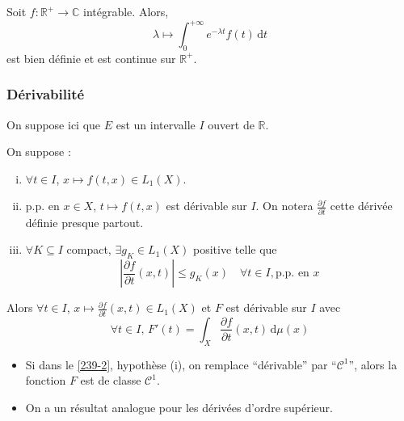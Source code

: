 
	\begin{example}
		Soit $f : \mathbb{R}^+ \rightarrow \mathbb{C}$ intégrable. Alors,
		\[ \lambda \mapsto \int_0^{+\infty} e^{-\lambda t} f(t) \, \mathrm{d}t \]
		est bien définie et est continue sur $\mathbb{R}^+$.
	\end{example}

	\subsubsection{Dérivabilité}


	On suppose ici que $E$ est un intervalle $I$ ouvert de $\mathbb{R}$.

	\begin{theorem}
		\label{239-2}
		On suppose :
		\begin{enumerate}[(i)]
			\item $\forall t \in I$, $x \mapsto f(t,x) \in L_1(X)$.
			\item p.p. en $x \in X$, $t \mapsto f(t,x)$ est dérivable sur $I$. On notera $\frac{\partial f}{\partial t}$ cette dérivée définie presque partout.
			\item $\forall K \subseteq I$ compact, $\exists g_K \in L_1(X)$ positive telle que
			\[ \left| \frac{\partial f}{\partial t}(x,t) \right| \leq g_K(x) \quad \forall t \in I, \text{p.p. en } x \]
		\end{enumerate}
		Alors $\forall t \in I$, $x \mapsto \frac{\partial f}{\partial t}(x, t) \in L_1(X)$ et $F$ est dérivable sur $I$ avec
		\[ \forall t \in I, \, F'(t) = \int_X \frac{\partial f}{\partial t}(x, t) \, \mathrm{d}\mu(x) \]
	\end{theorem}

	\begin{remark}
		\begin{itemize}
			\item Si dans le \cref{239-2}, hypothèse (i), on remplace ``dérivable'' par ``$\mathcal{C}^1$'', alors la fonction $F$ est de classe $\mathcal{C}^1$.
			\item On a un résultat analogue pour les dérivées d'ordre supérieur.
		\end{itemize}
	\end{remark}

